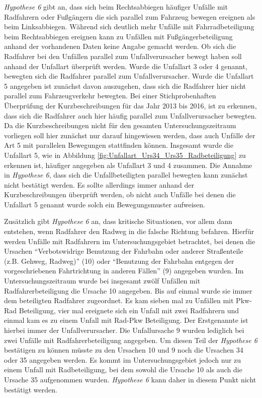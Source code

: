 \textit{Hypothese 6} gibt an, dass sich beim Rechtsabbiegen häufiger Unfälle mit Radfahrern oder Fußgängern die sich parallel zum Fahrzeug bewegen ereignen als beim Linksabbiegen. Während sich deutlich mehr Unfälle mit Fahrradbeteiligung beim Rechtsabbiegen ereignen kann zu Unfällen mit Fußgängerbeteiligung anhand der vorhandenen Daten keine Angabe gemacht werden. Ob sich die Radfahrer bei den Unfällen parallel zum Unfallverursacher bewegt haben soll anhand der Unfallart überprüft werden. Wurde die Unfallart 3 oder 4 genannt, bewegten sich die Radfahrer parallel zum Unfallverursacher. Wurde die Unfallart 5 angegeben ist zunächst davon auszugehen, dass sich die Radfahrer hier nicht parallel zum Fahrzeugverkehr bewegten. Bei einer Stichprobenhaften Überprüfung der Kurzbeschreibungen für das Jahr 2013 bis 2016, ist zu erkennen, dass sich die Radfahrer auch hier häufig parallel zum Unfallverursacher bewegten. Da die Kurzbeschreibungen nicht für den gesamten Untersuchungszeitraum vorliegen soll hier zunächst nur darauf hingewiesen werden, dass auch Unfälle der Art 5 mit parallelen Bewegungen stattfinden können. Insgesamt wurde die Unfallart 5, wie in Abbildung \ref{fig:Unfallart_Urs34_Urs35_Radbeteiligung} zu erkennen ist, häufiger angegeben als Unfallart 3 und 4 zusammen. Die Annahme in \textit{Hypothese 6}, dass sich die Unfallbeteiligten parallel bewegten kann zunächst nicht bestätigt werden. Es sollte allerdings immer anhand der Kurzbeschreibungen überprüft werden, ob nicht auch Unfälle bei denen die Unfallart 5 genannt wurde solch ein Bewegungsmuster aufweisen.

Zusätzlich gibt \textit{Hypothese 6} an, dass kritische Situationen, vor allem dann entstehen, wenn Radfahrer den Radweg in die falsche Richtung befahren. Hierfür werden Unfälle mit Radfahrern im Untersuchungsgebiet betrachtet, bei denen die Ursachen \enquote{Verbotswidrige Benutzung der Fahrbahn oder anderer Straßenteile (z.B. Gehweg, Radweg)} (10) oder \enquote{Benutzung der Fahrbahn entgegen der vorgeschriebenen Fahrtrichtung in anderen Fällen} (9) angegeben wurden. Im Untersuchungszeitraum wurde bei insgesamt zwölf Unfällen mit Radfahrerbeteiligung die Ursache 10 angegeben. Bis auf einmal wurde sie immer dem beteiligten Radfahrer zugeordnet. Es kam sieben mal zu Unfällen mit Pkw-Rad Beteiligung, vier mal ereignete sich ein Unfall mit zwei Radfahrern und einmal kam es zu einem Unfall mit Rad-Pkw Beteiligung. Der Erstgenannte ist hierbei immer der Unfallverursacher. Die Unfallursache 9 wurden lediglich bei zwei Unfälle mit Radfahrerbeteiligung angegeben. Um diesen Teil der \textit{Hypothese 6} bestätigen zu können müsste zu den Ursachen 10 und 9 noch die Ursachen 34 oder 35 angegeben werden. Es kommt im Untersuchungsgebiet jedoch nur zu einem Unfall mit Radbeteiligung, bei dem sowohl die Ursache 10 als auch die Ursache 35 aufgenommen wurden. \textit{Hypothese 6} kann daher in diesem Punkt nicht bestätigt werden.

